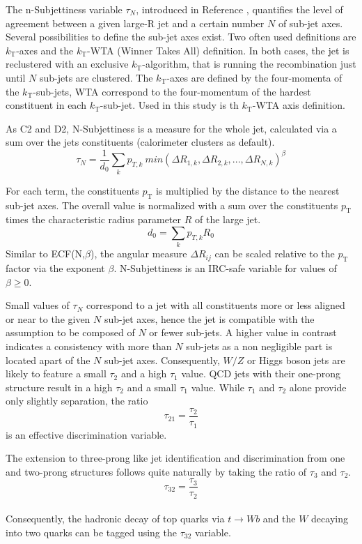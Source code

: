 
The n-Subjettiness variable $\tau_N$, introduced in Reference \cite{bib:nsub}, quantifies the level of agreement between a given large-R jet and a certain number $N$ of sub-jet axes. Several possibilities to define the sub-jet axes exist. Two often used definitions are $k_\mathrm{T}$-axes and the $k_\mathrm{T}$-WTA (Winner Takes All) definition. In both cases, the jet is reclustered with an exclusive $k_\mathrm{T}$-algorithm, that is running the recombination just until $N$ sub-jets are clustered. The $k_\mathrm{T}$-axes are defined by the four-momenta of the $k_\mathrm{T}$-sub-jets, WTA correspond to the four-momentum of the hardest constituent in each $k_\mathrm{T}$-sub-jet. Used in this study is th $k_\mathrm{T}$-WTA axis definition. 

As C2 and D2, N-Subjettiness is a measure for the whole jet, calculated via a sum over the jets constituents (calorimeter clusters as default).
\begin{equation}
\tau_N = \frac{1}{d_0}\sum_k p_{T,k}\:min(\Delta R_{1,k},\Delta R_{2,k},...,\Delta R_{N,k})^{\beta}
\end{equation}

For each term, the constituents $p_{\mathrm{T}}$ is multiplied by the distance to the nearest sub-jet axes. The overall value is normalized with a sum over the constituents $p_{\mathrm{T}}$ times the characteristic radius parameter $R$ of the large jet.
\begin{equation}
d_0=\sum_k p_{T,k}R_0
\end{equation}
Similar to ECF(N,$\beta$), the angular measure $\Delta R_{ij}$ can be scaled relative to the $p_{\mathrm{T}}$ factor via the exponent $\beta$. N-Subjettiness is an IRC-safe variable for values of $\beta \ge 0$.

Small values of $\tau_N$ correspond to a jet with all constituents more or less aligned or near to the given $N$ sub-jet axes, hence the jet is compatible with the assumption to be composed of $N$ or fewer sub-jets. A higher value in contrast indicates a consistency with more than $N$ sub-jets as a non negligible part is located apart of the $N$ sub-jet axes. Consequently, $W/Z$ or Higgs boson jets are likely to feature a small $\tau_2$ and a high $\tau_1$ value. QCD jets with their one-prong structure result in a high $\tau_{2}$ and a small $\tau_{1}$ value. While $\tau_1$ and $\tau_2$ alone provide only slightly separation, the ratio 
\begin{equation}
\tau_{21} = \frac{\tau_2}{\tau_1}  
\end{equation}
is an effective discrimination variable.

The extension to three-prong like jet identification and discrimination from one and two-prong structures follows quite naturally by taking the ratio of $\tau_3$ and $\tau_2$.
\begin{equation}
\tau_{32} = \frac{\tau_3}{\tau_2}  
\end{equation} \\
Consequently, the hadronic decay of top quarks via $t \rightarrow Wb$ and the $W$ decaying into two quarks can be tagged using the $\tau_{32}$ variable.
